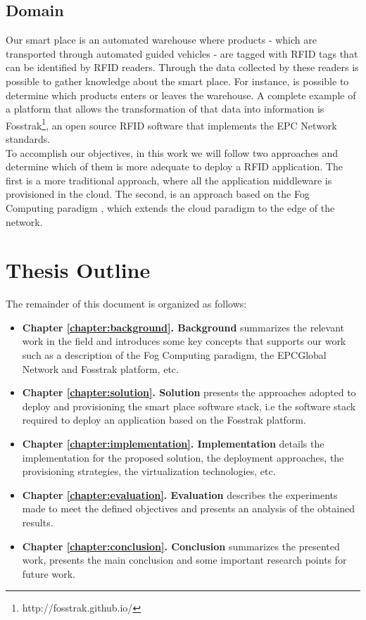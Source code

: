 \subsection{Domain}
\label{sub:domain}
Our smart place is an automated warehouse where products - which are transported through automated
guided vehicles - are tagged with \gls{RFID} tags that can be identified by \gls{RFID} readers.
Through the data collected by these readers is possible to gather knowledge about the smart place.
For instance, is possible to determine which products enters or leaves the warehouse. A complete example
of a platform that allows the transformation of that data into information is Fosstrak\footnote{http://fosstrak.github.io/},
an open source \gls{RFID} software that implements the \gls{EPC} Network standards.\\

To accomplish our objectives, in this work we will follow two approaches and determine which of them
is more adequate to deploy a \gls{RFID} application. The first is a more traditional approach, where
all the application middleware is provisioned in the cloud. The second, is an approach based on the
Fog Computing paradigm \cite{bonomi2012fog}, which extends the cloud paradigm to the edge of the
network.

\section{Thesis Outline}
\label{section:outline}
The remainder of this document is organized as follows:
\begin{itemize}
  \item \textbf{Chapter \ref{chapter:background}. Background} summarizes the relevant work in the field and
  introduces some key concepts that supports our work such as a description of the Fog Computing paradigm,
  the EPCGlobal Network and Fosstrak platform, etc.
  \item \textbf{Chapter \ref{chapter:solution}. Solution} presents the approaches adopted to deploy
  and provisioning the smart place software stack, i.e the software stack required to deploy
  an application based on the Fosstrak platform.
  \item \textbf{Chapter \ref{chapter:implementation}. Implementation} details the implementation
  for the proposed solution, the deployment approaches, the provisioning strategies, the virtualization
  technologies, etc.
  \item \textbf{Chapter \ref{chapter:evaluation}. Evaluation} describes the experiments made to meet
  the defined objectives and presents an analysis of the obtained results.
  \item \textbf{Chapter \ref{chapter:conclusion}. Conclusion} summarizes the presented work,
  presents the main conclusion and some important research points for future work.
\end{itemize}
